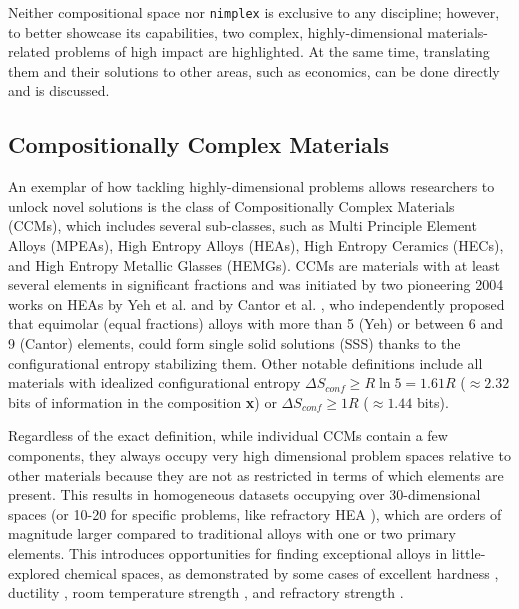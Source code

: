 Neither compositional space nor \texttt{nimplex} is exclusive to any discipline; however, to better showcase its capabilities, two complex, highly-dimensional materials-related problems of high impact are highlighted. At the same time, translating them and their solutions to other areas, such as economics, can be done directly and is discussed.


\subsection{Compositionally Complex Materials} \label{nimplex:ssec:compositionallycomplex}

An exemplar of how tackling highly-dimensional problems allows researchers to unlock novel solutions is the class of Compositionally Complex Materials (CCMs), which includes several sub-classes, such as Multi Principle Element Alloys (MPEAs), High Entropy Alloys (HEAs), High Entropy Ceramics (HECs), and High Entropy Metallic Glasses (HEMGs). CCMs are materials with at least several elements in significant fractions and was initiated by two pioneering 2004 works on HEAs by Yeh et al. \cite{Yeh2004NanostructuredOutcomes} and by Cantor et al. \cite{Cantor2004MicrostructuralAlloys}, who independently proposed that equimolar (equal fractions) alloys with more than 5 (Yeh) or between 6 and 9 (Cantor) elements, could form single solid solutions (SSS) thanks to the configurational entropy stabilizing them. Other notable definitions include all materials with idealized configurational entropy $\Delta S_{conf}  \geq R \ln{5} = 1.61R$ \cite{Li2019MechanicalAlloys} ($\approx2.32$ bits of information in the composition \textbf{x}) or $\Delta S_{conf}  \geq 1R$  \cite{Senkov2019HighAlloys} ($\approx1.44$ bits).

Regardless of the exact definition, while individual CCMs contain a few components, they always occupy very high dimensional problem spaces relative to other materials because they are not as restricted in terms of which elements are present. This results in homogeneous datasets occupying over 30-dimensional spaces (or 10-20 for specific problems, like refractory HEA \cite{Senkov2019HighAlloys}), which are orders of magnitude larger compared to traditional alloys with one or two primary elements. This introduces opportunities for finding exceptional alloys in little-explored chemical spaces, as demonstrated by some cases of excellent hardness \cite{Senkov2010RefractoryAlloys}, ductility \cite{Zhang2019PrecipitationAlloy}, room temperature strength \cite{Long2019AProperties}, and refractory strength \cite{Senkov2016DevelopmentSuperalloy, Kang2021SuperiorProcess}. 

